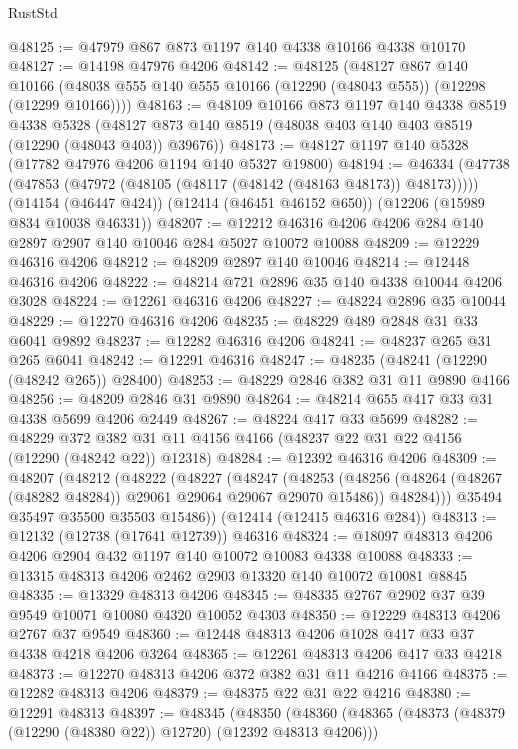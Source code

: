 \begin{lexlean}{RustStd}
\begin{coremodule}
@48125 := @47979 @867 @873 @1197 @140 @4338 @10166 @4338 @10170
@48127 := @14198 @47976 @4206
@48142 := @48125
    (@48127
      @867
      @140
      @10166
      (@48038 @555 @140 @555 @10166 (@12290 (@48043 @555)) (@12298 (@12299 @10166))))
@48163 := @48109
    @10166
    @873
    @1197
    @140
    @4338
    @8519
    @4338
    @5328
    (@48127 @873 @140 @8519 (@48038 @403 @140 @403 @8519 (@12290 (@48043 @403)) @39676))
@48173 := @48127 @1197 @140 @5328 (@17782 @47976 @4206 @1194 @140 @5327 @19800)
@48194 := @46334
    (@47738 (@47853 (@47972 (@48105 (@48117 (@48142 (@48163 @48173)) @48173)))))
    (@14154 (@46447 @424))
    (@12414 (@46451 @46152 @650))
    (@12206 (@15989 @834 @10038 @46331))
@48207 := @12212 @46316 @4206 @4206 @284 @140 @2897 @2907 @140 @10046 @284 @5027 @10072 @10088
@48209 := @12229 @46316 @4206
@48212 := @48209 @2897 @140 @10046
@48214 := @12448 @46316 @4206
@48222 := @48214 @721 @2896 @35 @140 @4338 @10044 @4206 @3028
@48224 := @12261 @46316 @4206
@48227 := @48224 @2896 @35 @10044
@48229 := @12270 @46316 @4206
@48235 := @48229 @489 @2848 @31 @33 @6041 @9892
@48237 := @12282 @46316 @4206
@48241 := @48237 @265 @31 @265 @6041
@48242 := @12291 @46316
@48247 := @48235 (@48241 (@12290 (@48242 @265)) @28400)
@48253 := @48229 @2846 @382 @31 @11 @9890 @4166
@48256 := @48209 @2846 @31 @9890
@48264 := @48214 @655 @417 @33 @31 @4338 @5699 @4206 @2449
@48267 := @48224 @417 @33 @5699
@48282 := @48229
    @372
    @382
    @31
    @11
    @4156
    @4166
    (@48237 @22 @31 @22 @4156 (@12290 (@48242 @22)) @12318)
@48284 := @12392 @46316 @4206
@48309 := @48207
    (@48212
      (@48222
        (@48227
          (@48247
            (@48253
              (@48256 (@48264 (@48267 (@48282 @48284)) @29061 @29064 @29067 @29070 @15486))
              @48284)))
        @35494
        @35497
        @35500
        @35503
        @15486))
    (@12414 (@12415 @46316 @284))
@48313 := @12132 (@12738 (@17641 @12739)) @46316
@48324 := @18097 @48313 @4206 @4206 @2904 @432 @1197 @140 @10072 @10083 @4338 @10088
@48333 := @13315 @48313 @4206 @2462 @2903 @13320 @140 @10072 @10081 @8845
@48335 := @13329 @48313 @4206
@48345 := @48335 @2767 @2902 @37 @39 @9549 @10071 @10080 @4320 @10052 @4303
@48350 := @12229 @48313 @4206 @2767 @37 @9549
@48360 := @12448 @48313 @4206 @1028 @417 @33 @37 @4338 @4218 @4206 @3264
@48365 := @12261 @48313 @4206 @417 @33 @4218
@48373 := @12270 @48313 @4206 @372 @382 @31 @11 @4216 @4166
@48375 := @12282 @48313 @4206
@48379 := @48375 @22 @31 @22 @4216
@48380 := @12291 @48313
@48397 := @48345
    (@48350
      (@48360
        (@48365 (@48373 (@48379 (@12290 (@48380 @22)) @12720) (@12392 @48313 @4206)))

\end{coremodule}
\end{lexlean}
